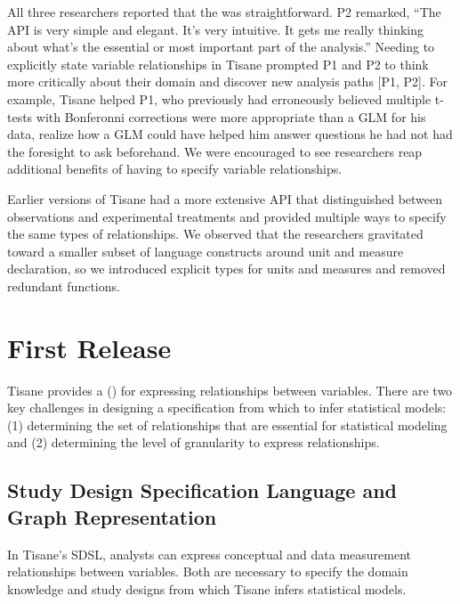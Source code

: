 All three researchers reported that the \SDSLlong %
was straightforward. P2 remarked, ``The API is very simple and elegant. It's
very intuitive. It gets me really thinking about what's the essential or most
important part of the analysis.'' Needing to explicitly state variable
relationships in Tisane prompted P1 and P2 to think more critically about their
domain and discover new analysis paths [P1, P2]. For example, Tisane helped
P1, who previously had erroneously believed multiple t-tests with Bonferonni
corrections were more appropriate than a GLM for his data, realize how a GLM
could have helped him answer questions he had not had the foresight to ask
beforehand. %
We were encouraged to see researchers reap additional benefits of having to
specify variable relationships.

Earlier versions of Tisane had a more extensive API that distinguished between
observations and experimental treatments and provided multiple ways to specify
the same types of relationships. We observed that the researchers gravitated
toward a smaller subset of language constructs around unit and measure
declaration, so we introduced explicit types for units and measures and removed
redundant functions.

\tableStudyDesignTools

\section{First Release} \label{sec:tisane}

Tisane provides a \textit{\SDSLlong} (\textit{\SDSL}) for expressing
relationships between variables. There are two key challenges in designing a
specification from which to infer statistical models: (1) determining the set of
relationships that are essential for statistical modeling and (2) determining
the level of granularity to express relationships.

\subsection{Study Design Specification Language and Graph Representation} \label{sec:dsl}
In Tisane's SDSL, analysts can express conceptual and data measurement
relationships between variables. Both are necessary to specify the domain
knowledge and study designs from which Tisane infers statistical models.


